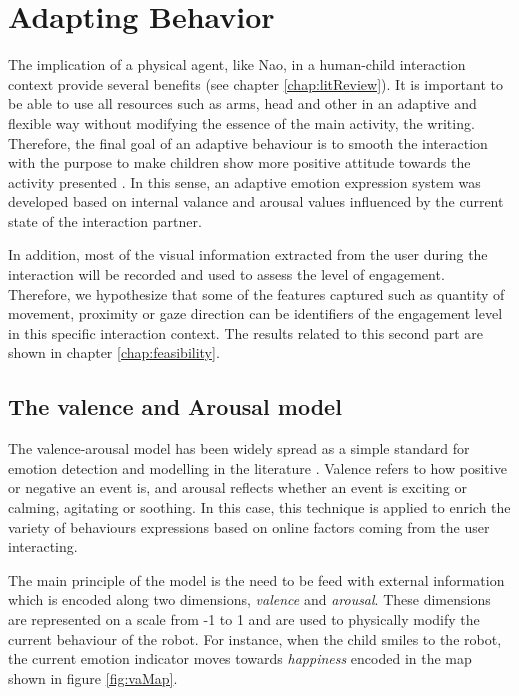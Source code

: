 \chapter{Adapting Behavior} \label{chap:systemOverview}

The implication of a physical agent, like Nao, in a human-child interaction context provide several benefits (see chapter \ref{chap:litReview}). It is important to be able to use all resources such as arms, head and other in an adaptive and flexible way without modifying the essence of the main activity, the writing. Therefore, the final goal of an adaptive behaviour is to smooth the interaction with the purpose to make children show more positive attitude towards the activity presented \cite{lim2014mei}\cite{tielman2014adaptive}. In this sense, an adaptive emotion expression system was developed based on internal valance and arousal values influenced by the current state of the interaction partner.

In addition, most of the visual information extracted from the user during the interaction will be recorded and used to assess the level of engagement. Therefore, we hypothesize that some of the features captured such as quantity of movement, proximity or gaze direction can be identifiers of the engagement level in this specific interaction context. The results related to this second part are shown in chapter \ref{chap:feasibility}.

\section{The valence and Arousal model}
	
The valence-arousal model has been widely spread as a simple standard for emotion detection and modelling in the literature \cite{russell1980circumplex}. Valence refers to how positive or negative an event is, and arousal reflects whether an event is exciting or calming, agitating or soothing. In this case, this technique is applied to enrich the variety of behaviours expressions based on online factors coming from the user interacting.

The main principle of the model is the need to be feed with external information which is encoded along two dimensions, \textit{valence} and \textit{arousal}. These dimensions are represented on a scale from -1 to 1 and are used to physically modify the current behaviour of the robot. For instance, when the child smiles to the robot, the current emotion indicator moves towards \textit{happiness} encoded in the map shown in figure \ref{fig:vaMap}.

